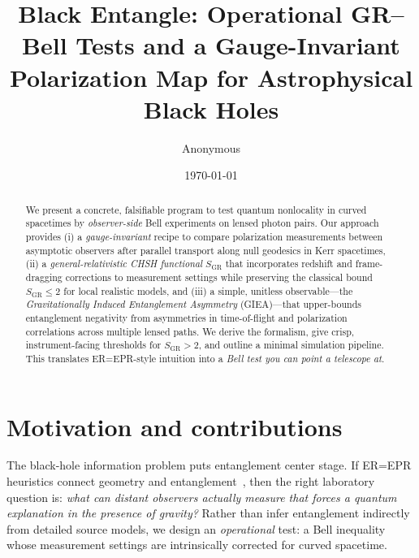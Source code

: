 \documentclass[11pt]{article}
\title{\textbf{Black Entangle: Operational GR--Bell Tests and a Gauge-Invariant\\
Polarization Map for Astrophysical Black Holes}}
\author{Anonymous}
\date{\today}
\begin{document}
\maketitle

\begin{abstract}
We present a concrete, falsifiable program to test quantum nonlocality in curved spacetimes by \emph{observer-side} Bell experiments on lensed photon pairs. Our approach provides (i) a \emph{gauge-invariant} recipe to compare polarization measurements between asymptotic observers after parallel transport along null geodesics in Kerr spacetimes, (ii) a \emph{general-relativistic CHSH functional} \(S_{\mathrm{GR}}\) that incorporates redshift and frame-dragging corrections to measurement settings while preserving the classical bound \(S_{\mathrm{GR}}\le 2\) for local realistic models, and (iii) a simple, unitless observable---the \emph{Gravitationally Induced Entanglement Asymmetry} (GIEA)---that upper-bounds entanglement negativity from asymmetries in time-of-flight and polarization correlations across multiple lensed paths. We derive the formalism, give crisp, instrument-facing thresholds for \(S_{\mathrm{GR}}>2\), and outline a minimal simulation pipeline. This translates ER=EPR-style intuition into a \emph{Bell test you can point a telescope at}.
\end{abstract}

\section{Motivation and contributions}
The black-hole information problem puts entanglement center stage. If ER=EPR heuristics connect geometry and entanglement~\cite{MaldacenaSusskind2013}, then the right laboratory question is: \emph{what can distant observers actually measure that forces a quantum explanation in the presence of gravity?} Rather than infer entanglement indirectly from detailed source models, we design an \emph{operational} test: a Bell inequality whose measurement settings are intrinsically corrected for curved spacetime.
\end{document}
